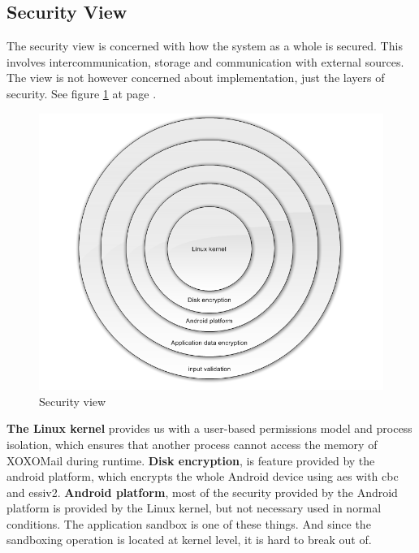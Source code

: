 \subsection{Security View}
The security view is concerned with how the system as a whole is secured. This involves intercommunication, storage and communication with external sources. The view is not however concerned about implementation, just the layers of security.
See figure \ref{fig:securityview} at page \pageref{fig:securityview}.

\begin{figure}
	\includegraphics[width=\textwidth]{securityview.png}
	\caption{Security view}
	\label{fig:securityview}
\end{figure} \hfill
\newline
\newline
\textbf{The Linux kernel} provides us with a user-based permissions model and process isolation, which ensures that another process cannot access the memory of XOXOMail during runtime.
\newline
\newline
\textbf{Disk encryption}, is feature provided by the android platform, which encrypts the whole Android device using \gls{aes} with \gls{cbc} and \gls{essiv2}.\cite{bib:crypto}
\newline
\newline
\textbf{Android platform}, most of the security provided by the Android platform is provided by the Linux kernel, but not necessary used in normal conditions. The application sandbox is one of these things. And since the sandboxing operation is located at kernel level, it is hard to break out of. 
